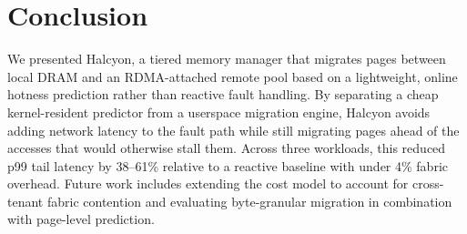 \section{Conclusion}
We presented Halcyon, a tiered memory manager that migrates pages between local DRAM and an RDMA-attached remote pool based on a lightweight, online hotness prediction rather than reactive fault handling. By separating a cheap kernel-resident predictor from a userspace migration engine, Halcyon avoids adding network latency to the fault path while still migrating pages ahead of the accesses that would otherwise stall them. Across three workloads, this reduced p99 tail latency by 38--61\% relative to a reactive baseline with under 4\% fabric overhead. Future work includes extending the cost model to account for cross-tenant fabric contention and evaluating byte-granular migration in combination with page-level prediction.



